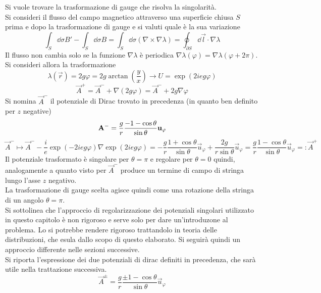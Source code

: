 Si vuole trovare la trasformazione di gauge che risolva la singolarità.\\

Si consideri il flusso del campo magnetico attraverso una superficie chiusa $S$
prima e dopo la trasformazione di gauge e si valuti quale è la sua variazione
$$
   \int_S \dd\sigma B' - \int_S \dd\sigma B = \int_S \dd\sigma (\nabla \times \nabla \lambda)
      = \oint_{\partial S} \dd\vec l \cdot \nabla \lambda
$$
Il flusso non cambia solo se la funzione $\nabla \lambda$ è periodica $\nabla
\lambda(\varphi) = \nabla \lambda( \varphi + 2\pi)$. Si consideri allora la trasformazione
$$
\lambda(\vec r) = 2g\varphi = 2g\arctan\left(\frac{y}{x}\right) \to U = \exp(2ieg\varphi)
$$
\begin{equation}\label{eq:gaugetrasf}
   \vec A ^+ = \vec A ^- + \nabla(2g \varphi) = \vec A ^- + 2g\nabla\varphi
\end{equation}
Si nomina $\vec A^-$ il potenziale di Dirac trovato in precedenza (in quanto ben
definito per $z$ negative)
$$
   \vec A^- = \frac{g}{r}\frac{-1 - \cos\theta}{\sin\theta} \vec u _\varphi  \\
$$
$$
  \vec A ^- \mapsto \vec A ^- - \frac{i}{e} \exp( -2ieg\varphi )\nabla \exp(2ieg\varphi ) =
     -\frac{g}{r}\frac{1+\cos\theta}{\sin\theta}\vec u _\varphi
     + \frac{2g}{r\sin\theta}\vec u _\varphi
     = \frac{g}{r}\frac{1 - \cos\theta}{\sin\theta} \vec u _\varphi
     =: \vec A ^+
$$
Il potenziale trasformato è singolare per $\theta = \pi$ e regolare per
$\theta =  0$ quindi, analogamente a quanto visto per $\vec A^-$ produce un termine
di campo di stringa lungo l'asse $z$ negativo.\\
La trasformazione di gauge scelta agisce quindi come una rotazione della stringa
di un angolo $\theta = \pi$.\\

Si sottolinea che l'approccio di regolarizzazione dei potenziali singolari
utilizzato in questo capitolo è non rigoroso e serve solo per dare un'introduzone
al problema. Lo si potrebbe rendere rigoroso trattandolo in teoria delle
distribuzioni, che esula dallo scopo di questo elaborato. Si seguirà quindi
un approccio differente nelle sezioni successive. \\

Si riporta l'espressione dei due potenziali di dirac definiti in precedenza, che
sarà utile nella trattazione successiva.
\begin{equation}\label{eq:localdiracpotential}
  \vec A^\pm = \frac{g}{r}\frac{\pm 1 - \cos\theta}{\sin\theta} \vec u _\varphi
\end{equation}

